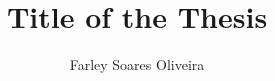 

% 
\documentclass[a4paper,11pt]{jreport}

\usepackage[dvipdfmx]{graphicx}  
\usepackage{amsmath}
\usepackage{amsfonts}
\usepackage{varioref}


\DeclareMathOperator{\cut}{cut\,}
\DeclareMathOperator*{\vol}{vol\,}
\DeclareMathOperator*{\ncut}{Ncut\,}
\DeclareMathOperator*{\argmin}{\arg\!\min}



\usepackage[left=25truemm,top=35truemm,right=25truemm,bottom=50truemm]{geometry}
\usepackage{times} %

\setcounter{tocdepth}{3}
\setcounter{page}{-1}

\setlength{\parskip}{0em}
\setlength{\topsep}{0em}


\usepackage{coins-jp-utf8}

\title{Title of the Thesis}
\author{Farley Soares Oliveira}

